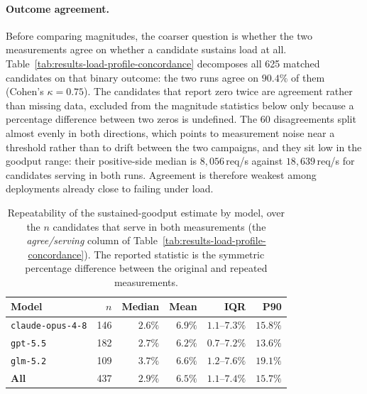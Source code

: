 \paragraph{Outcome agreement.}
Before comparing magnitudes, the coarser question is whether the two
measurements agree on whether a candidate sustains load at all.
Table~\ref{tab:results-load-profile-concordance} decomposes all 625 matched
candidates on that binary outcome: the two runs agree on $90.4\%$ of them
(Cohen's $\kappa=0.75$). The candidates that report zero twice are
agreement rather than missing data, excluded from the magnitude statistics
below only because a percentage difference between two zeros is undefined.
The 60 disagreements split almost evenly in both directions, which points
to measurement noise near a threshold rather than to drift between the two
campaigns, and they sit low in the goodput range: their positive-side
median is $8{,}056$\,req/s against $18{,}639$\,req/s for candidates
serving in both runs. Agreement is therefore weakest among deployments
already close to failing under load.

\begin{table}[H]
  \centering
  \caption{Repeatability of the sustained-goodput estimate by model, over the
    $n$ candidates that serve in both measurements (the \emph{agree/serving}
    column of Table~\ref{tab:results-load-profile-concordance}). The reported
    statistic is the symmetric percentage difference between the original and
    repeated measurements.}
  \label{tab:results-load-profile-repeatability}
  \footnotesize
  \begin{tabular}{@{}lrrrrr@{}}
    \toprule
    \textbf{Model} & \textbf{$n$} & \textbf{Median} & \textbf{Mean} & \textbf{IQR} & \textbf{P90} \\
    \midrule
    \texttt{claude-opus-4-8} & 146 & $2.6\%$ & $6.9\%$ & $1.1$--$7.3\%$ & $15.8\%$ \\
    \texttt{gpt-5.5}         & 182 & $2.7\%$ & $6.2\%$ & $0.7$--$7.2\%$ & $13.6\%$ \\
    \texttt{glm-5.2}         & 109 & $3.7\%$ & $6.6\%$ & $1.2$--$7.6\%$ & $19.1\%$ \\
    \midrule
    \textbf{All}             & 437 & $2.9\%$ & $6.5\%$ & $1.1$--$7.4\%$ & $15.7\%$ \\
    \bottomrule
  \end{tabular}
\end{table}

